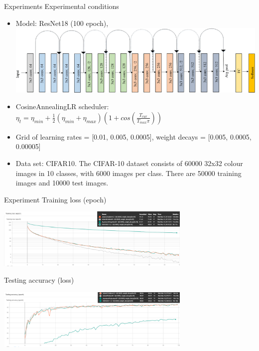 \documentclass[aspectratio=169, 12pt]{beamer}
\begin{document}
\begin{frame}{Experiments}
    Experimental conditions
        \begin{itemize}
            \item Model: ResNet18 (100 epoch),
            \includegraphics[scale=0.3]{resnet18.png}
            
            \item CosineAnnealingLR scheduler: $\eta_t = \eta_{min} + \frac{1}{2} \left( \eta_{min} + \eta_{max} \right) \left(1 + cos\left(\frac{T_{cur}}{T_{max} \pi} \right) \right)$
            \item Grid of learning rates = [0.01, 0.005, 0.0005], 
            weight decays = [0.005, 0.0005, 0.00005]
            \item Data set: CIFAR10. The CIFAR-10 dataset consists of 60000 32x32 colour images in 10 classes, with 6000 images per class. There are 50000 training images and 10000 test images. 
        \end{itemize}
     
\end{frame}

\begin{frame}{Experiment}              
    Training loss (epoch)
\begin{center}
\includegraphics[width=0.7\textwidth, height=0.3\textheight]{training_loss.png}
\end{center}
    Testing accuracy (loss)
\begin{center}
    \includegraphics[width=0.7\textwidth, height=0.3\textheight]{testing_accuracy.png}
\end{center}
\end{frame}
\end{document}
